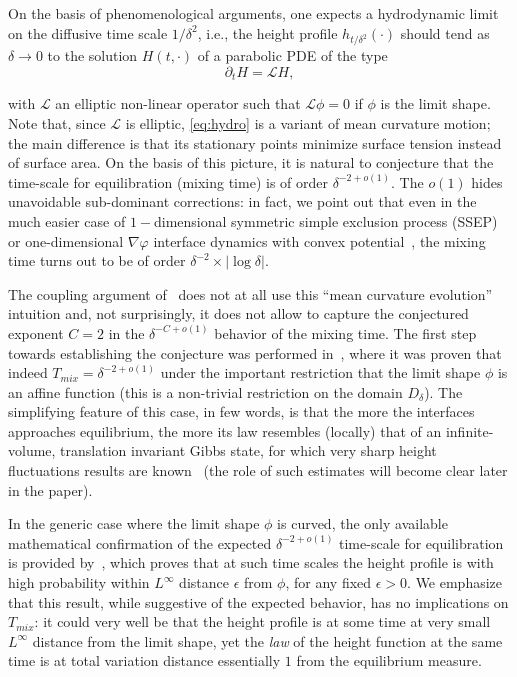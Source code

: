 \documentclass[AHL,Unicode,longabstracts,published]{cedram}
\newcommand{\clL}{\mathcal{L}}
\begin{document}
On the basis of phenomenological arguments, one expects a hydrodynamic limit on the diffusive time scale $1/\delta^2$, i.e., the height profile $h_{t/\delta^2}(\cdot)$ should tend as $\delta\to0$ to the solution $H(t,\cdot)$ of a parabolic PDE of the type
\begin{equation}\label{eq:hydro}
\partial_t H=\clL H,
\end{equation}

with $\clL$ an elliptic non-linear operator such that $\clL\phi=0$ if $\phi$ is the limit shape. Note that, since $\clL$ is elliptic, \eqref{eq:hydro} is a variant of mean curvature motion; the main difference is that its stationary points minimize surface tension instead of surface area. On the basis of this picture, it is natural to conjecture that the time-scale for equilibration (mixing time) is of order $\delta^{-2+o(1)}$. The $o(1)$ hides unavoidable sub-dominant corrections: in fact, we point out that even in the much easier case of $1-$dimensional symmetric simple exclusion process (SSEP) \cite{Lacoin,Wilson} or one-dimensional $\nabla\varphi$ interface dynamics with convex potential~\cite{CLL}, the mixing time turns out to be of order $\delta^{-2}\times |\log\delta|$.

The coupling argument of~\cite{LRS} does not at all use this ``mean curvature evolution'' intuition and, not surprisingly, it does not allow to capture the conjectured exponent $C=2$ in the $\delta^{-C+o(1)}$ behavior of the mixing time. The first step towards establishing the conjecture was performed in~\cite{CMT}, where it was proven that indeed $T_{mix}=\delta^{-2+o(1)}$ under the important restriction that the limit shape $\phi$ is an affine function (this is a non-trivial restriction on the domain $D_\delta$). The simplifying feature of this case, in few words, is that the more the interfaces approaches equilibrium, the more its law resembles (locally) that of an infinite-volume, translation invariant Gibbs state, for which very sharp height fluctuations results are known~\cite{Kenyon-lectures} (the role of such estimates will become clear later in the paper).

In the generic case where the limit shape $\phi$ is curved, the only available mathematical confirmation of the expected $\delta^{-2+o(1)}$ time-scale for equilibration is provided by~\cite{LT_cmp}, which proves that at such time scales the height profile is with high probability within $L^\infty$ distance $\epsilon$ from $\phi$, for any fixed $\epsilon>0$. We emphasize that this result, while suggestive of the expected behavior, has no implications on $T_{mix}$: it could very well be that the height profile is at some time at very small $L^\infty$ distance from the limit shape, yet the \emph{law} of the height function at the same time is at total variation distance essentially $1$ from the equilibrium measure.
\end{document}
